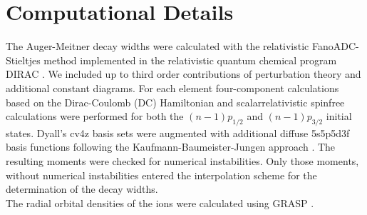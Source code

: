 \section{Computational Details}
\label{section:computational}
The Auger-Meitner
decay widths were calculated with the relativistic FanoADC-Stieltjes
method
implemented in the relativistic quantum chemical program DIRAC \cite{DIRAC17}.
We included up to third order contributions of perturbation theory and additional
constant diagrams.
For each element four-component calculations based on the
Dirac-Coulomb (DC) Hamiltonian
and scalarrelativistic spinfree calculations were
performed for both the $(n-1)p_{1/2}$ and $(n-1)p_{3/2}$ initial states.
Dyall's cv4z basis sets \cite{Dyall4s-7s09} were augmented with additional diffuse
5s5p5d3f
basis functions following the Kaufmann-Baumeister-Jungen approach
\cite{Kaufmann89}.
The resulting moments were checked for numerical instabilities.
Only those moments, without numerical instabilities entered the interpolation
scheme for the determination of the decay widths.\\
The radial orbital densities of the ions were calculated using GRASP
\cite{Dyall89,Parpia96}.
